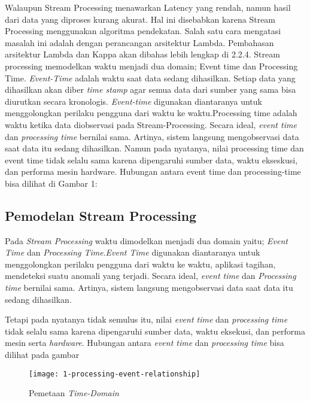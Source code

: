 Walaupun Stream Processing menawarkan Latency yang rendah, namun hasil dari data yang diproses
kurang akurat. Hal ini disebabkan karena Stream Processing menggunakan algoritma pendekatan.
Salah satu cara mengatasi masalah ini adalah dengan perancangan arsitektur Lambda. Pembahasan 
arsitektur Lambda dan Kappa akan dibahas lebih lengkap di 2.2.4. Stream processing memodelkan waktu 
menjadi dua domain; Event time dan Processing Time. \textit{Event-Time} adalah waktu saat data 
sedang dihasilkan. Setiap data yang dihasilkan akan diber \textit{time stamp} agar semua data dari 
sumber yang sama bisa diurutkan secara kronologis. \textit{Event-time} digunakan
diantaranya untuk menggolongkan perilaku pengguna dari waktu ke waktu.Processing time adalah
waktu ketika data diobservasi pada Stream-Processing. Secara ideal, \textit{event time} dan 
\textit{processing time} bernilai sama. Artinya, sistem langsung mengobservasi data saat data itu 
sedang dihasilkan. Namun pada nyatanya, nilai processing time dan event time tidak selalu sama 
karena dipengaruhi sumber data, waktu ekseskusi, dan performa mesin hardware. Hubungan antara event 
time dan processing-time bisa dilihat di Gambar 1:

 

\subsection{Pemodelan Stream Processing} 

Pada \textit{Stream Processing} waktu dimodelkan menjadi dua domain yaitu; \textit{Event Time} dan 
\textit{Processing Time}.\textit{Event Time} digunakan diantaranya untuk menggolongkan perilaku pengguna dari waktu ke waktu,  aplikasi tagihan, mendeteksi suatu anomali yang terjadi. Secara ideal, \textit{event time} dan  \textit{Processing time} bernilai sama. Artinya, sistem langsung mengobservasi data saat data itu sedang dihasilkan.
 
Tetapi pada nyatanya tidak semulus itu, nilai \textit{event time} dan 
\textit{processing time} tidak selalu sama karena dipengaruhi sumber data, waktu eksekusi, dan 
performa mesin serta \textit{hardware}. Hubungan antara \textit{event time} dan \textit{processing 
time} bisa dilihat pada gambar

\begin{figure}[H] 
	\centering  
	\texttt{[image: 1-processing-event-relationship]}  
	\caption[Gambar Pemetaan {\it Time-Domain}]{Pemetaan {\it Time-Domain}} 
	\label{fig:processing-events relationship} 
\end{figure} 
 

